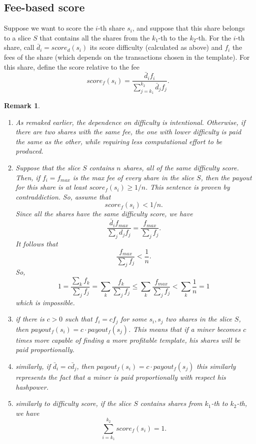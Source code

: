 \documentclass[11pt]{article}
\newtheorem{remark}{Remark}[subsection]
\begin{document}
\subsection{Fee-based score}
Suppose we want to score the $i$-th share $s_i$, and suppose that this share belongs to a slice $S$ that contains all the shares from the $k_1$-th to the $k_2$-th.
For the $i$-th share, call $\bar d_i = score_d(s_i)$ its score difficulty (calculated as above) and $f_i$ the fees of the share (which depends on the transactions chosen in the template). For this share, define the score relative to the fee
\[
	score_f(s_i) = \frac{\bar d_if_i}{\sum_{j=k_1}^{k_2}\bar d_j f_j}.
\]
\begin{remark}\label{properties-diff-based-score}
	\begin{enumerate}
		\item As remaked earlier, the dependence on difficulty is intentional. Otherwise, if there are two shares with the same fee, the one with lower difficulty is paid the same as the other, while requiring less computational effort to be produced.
		\item Suppose that the slice $S$ contains $n$ shares, all of the same difficulty score. Then, if $f_i = f_{max}$ is the max fee of every share in the slice $S$, then the payout for this share is at least $score_f(s_i) \ge 1/n$. This sentence is proven by contraddiction. So, assume that
		      \[score_f(s_i) < 1/n.\]
		      Since all the shares have the same difficulty score, we have
		      \[\frac{\bar d_if_{max}}{\sum_j d_j f_j} = \frac{f_{max}}{\sum_j f_j}.\]It follows that
		      \[ \frac{f_{max}}{\sum_j f_j} <\frac{1} {n}.\]
		      So,
		      \[ 1 = \frac{\sum_k f_k}{\sum_j f_j} = \sum_k \frac {f_k}{\sum_j f_j} \le \sum_k \frac{f_{max}}{\sum_j f_j}<\sum_k\frac{1}{n} = 1\]
		      which is impossible.
		\item if there is $c>0$ such that $f_i = cf_j$ for some $s_i, s_j$ two shares in the slice $S$, then $payout_f(s_i) = c \cdot payout_f(s_j)$. This means that if a miner becomes $c$ times more capable of finding a more profitable template, his shares will be paid proportionally.
		\item similarly, if $\bar d_i = c \bar d_j$, then $payout_f(s_i) = c \cdot payout_f(s_j)$ this similarly represents the fact that a miner is paid proportionally with respect his hashpower.
		\item similarly to difficulty score, if the slice $S$ contains shares from $k_1$-th to $k_2$-th, we have \[\sum_{i=k_1}^{k_2} score_f(s_i) = 1. \] \label{addstoone}
	\end{enumerate}

\end{remark}
\end{document}

